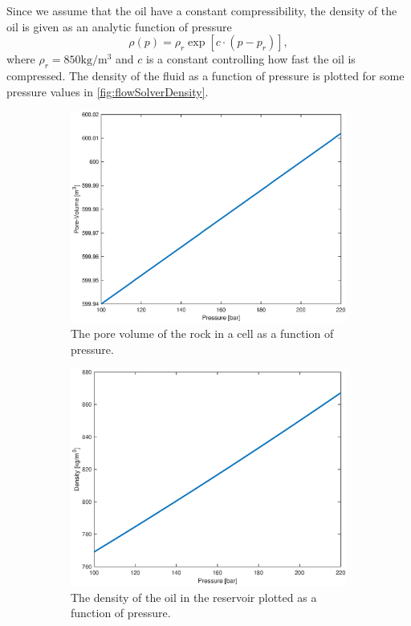 Since we assume that the oil have a constant compressibility, the density of the oil is given as an analytic function of pressure 
\begin{equation}
    \rho(p) = \rho_r\exp[c\cdot(p-p_r)],
    \label{eq:pressureSolverDensity}
\end{equation}
where $\rho_r = 850\text{kg}/\text{m}^3$ and $c$ is a constant controlling how fast the oil is compressed. The density of the fluid as a function of pressure is plotted for some pressure values in \autoref{fig:flowSolverDensity}.
\begin{figure}[H]
    \centering
    \begin{subfigure}[t]{0.48\textwidth}
        \includegraphics[width=\textwidth]{figures/flow_solver_pore-volume.eps}
        \caption{The pore volume of the rock in a cell as a function of pressure.}
        \label{fig:flowSolverPoreVolume}
        
    \end{subfigure}
    \begin{subfigure}[t]{0.48\textwidth}
        \includegraphics[width=\textwidth]{figures/flow_solver_density.eps}
        \caption{The density of the oil in the reservoir plotted as a function of pressure.}
        \label{fig:flowSolverDensity}
    \end{subfigure}
    \caption{}
\end{figure}

